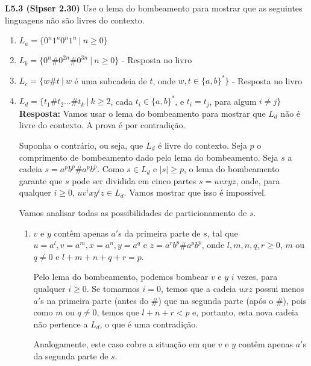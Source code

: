 
\noindent \textbf{L5.3 (Sipser 2.30)} Use o lema do bombeamento para mostrar que as seguintes linguagens não são livres do contexto.
\begin{enumerate}[label={\textbf{\alph*.}}]
    
    \item $L_a = \{0^n1^n0^n1^n \ |\ n \geq 0\}$\\[3pt]
    
    \item $L_b = \{0^n\#0^{2n}\#0^{3n} \ |\ n \geq 0\}$ - Resposta no livro
    
    \item $L_c = \{w\#t \ |\ w$ é uma subcadeia de $t$, onde $w, t \in \{a, b\}^*\}$ - Resposta no livro
    
    \item $L_d = \{t_1\#t_2 \ldots \#t_k \ |\ k \geq 2$, cada $t_i \in \{a, b\}^*$, e $t_i = t_j$, para algum $i\neq j\}$\\[3pt]
    \textbf{Resposta:} Vamos usar o lema do bombeamento para mostrar que $L_d$ não é livre do contexto. A prova é por contradição.
    
    Suponha o contrário, ou seja, que $L_d$ é livre do contexto. Seja $p$ o comprimento de bombeamento dado pelo lema do bombeamento. Seja $s$ a cadeia $s = a^pb^p\#a^pb^p$. Como $s \in L_d$ e $|s| \geq p$, o lema do bombeamento garante que $s$ pode ser dividida em cinco partes $s = uvxyz$, onde, para qualquer $i \geq 0$, $uv^ixy^iz \in L_d$. Vamos mostrar que isso é impossível.
    
    Vamos analisar todas as possibilidades de particionamento de $s$.
    
    \begin{enumerate}[label={\textbf{Caso \arabic*:}}]
        \item $v$ e $y$ contêm apenas $a'$s da primeira parte de $s$, tal que $u = a^l, v = a^m, x = a^n, y = a^q$ e $z = a^rb^p\#a^pb^p$, onde $l, m, n, q, r \geq 0$, $m$ ou $q \neq 0$ e $l + m + n + q + r = p$.
        
        Pelo lema do bombeamento, podemos bombear $v$ e $y$ $i$ vezes, para qualquer $i \geq 0$. Se tomarmos $i = 0$, temos que a cadeia $uxz$ possui menos $a'$s na primeira parte (antes do $\#$) que na segunda parte (após o $\#$), pois como $m$ ou $q \neq 0$, temos que $l + n + r < p$ e, portanto, esta nova cadeia não pertence a $L_d$, o que é uma contradição.
        
        Analogamente, este caso cobre a situação em que $v$ e $y$ contêm apenas $a'$s da segunda parte de $s$.
        

\end{enumerate}
\end{enumerate}
